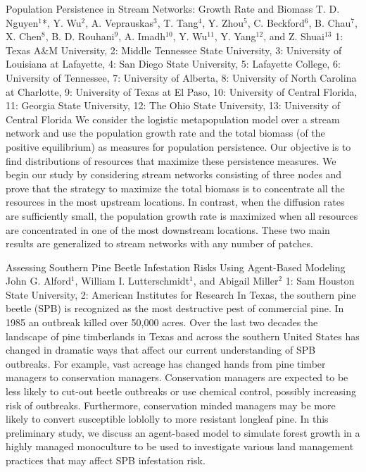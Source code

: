 \begin{addmargin}[2em]{0em}
\vspace{1.5ex}
\abs
{Population Persistence in Stream Networks: Growth Rate and Biomass}
{T. D. Nguyen$^{1}$*, Y. Wu$^{2}$, A. Veprauskas$^{3}$, T. Tang$^{4}$, Y. Zhou$^{5}$, C. Beckford$^{6}$, B. Chau$^{7}$, X. Chen$^{8}$, B. D. Rouhani$^{9}$, A. Imadh$^{10}$, Y. Wu$^{11}$, Y. Yang$^{12}$, and Z. Shuai$^{13}$}
{1: Texas A$\&$M University, 2: Middle Tennessee State University, 3: University of Louisiana at Lafayette, 4: San Diego State University, 5: Lafayette College, 6: University of Tennessee, 7: University of Alberta, 8: University of North Carolina at Charlotte, 9: University of Texas at El Paso, 10: University of Central Florida, 11: Georgia State University, 12: The Ohio State University, 13: University of Central Florida}
{We consider the logistic metapopulation model over a stream network and use the population growth rate and the total biomass (of the positive equilibrium) as measures for population persistence. Our objective is to find distributions of resources that maximize these persistence measures. We begin our study by considering stream networks consisting of three nodes and prove that the strategy to maximize the total biomass is to concentrate all the resources in the most upstream locations. In contrast, when the diffusion rates are sufficiently small, the population growth rate is maximized when all resources are concentrated in one of the most downstream locations. These two main results are generalized to stream networks with any number of patches.}


\vspace{1.5ex}
\abs
{Assessing Southern Pine Beetle Infestation Risks Using Agent-Based Modeling}
{John G. Alford$^{1}$, William I. Lutterschmidt$^{1}$, and Abigail Miller$^{2}$}
{1: Sam Houston State University, 2: American Institutes for Research}
{In Texas, the southern pine beetle (SPB) is recognized as the most destructive pest of commercial pine. In 1985 an outbreak killed over 50,000 acres. Over the last two decades the landscape of pine timberlands in Texas and across the southern United States has changed in dramatic ways that affect our current understanding of SPB outbreaks. For example, vast acreage has changed hands from pine timber managers to conservation managers. Conservation managers are expected to be less likely to cut-out beetle outbreaks or use chemical control, possibly increasing risk of outbreaks. Furthermore, conservation minded managers may be more likely to convert susceptible loblolly to more resistant longleaf pine. In this preliminary study, we discuss an agent-based model to simulate forest growth in a highly managed monoculture to be used to investigate various land management practices that may affect SPB infestation risk.}



\end{addmargin}
